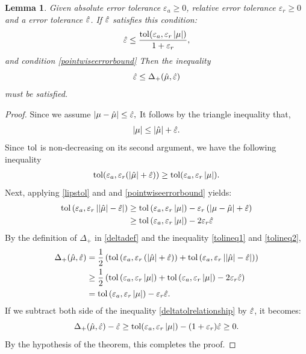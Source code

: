 \documentclass{iitthesis}
\newtheorem{lemma}[theorem]{Lemma}
\theoremstyle{definition}
\begin{document}
\begin{lemma}\label{cost2}
Given absolute error tolerance $\varepsilon_a \geq 0$, relative error tolerance $\varepsilon_r \geq 0$ and a error tolerance $\hat{\varepsilon}$. If $\hat{\varepsilon}$ satisfies this condition: $$ \hat{\varepsilon} \leq \frac{\operatorname{tol}(\varepsilon_a, \varepsilon_r\left \lvert \mu \right \rvert)}{1+\varepsilon_r}, $$ and condition \eqref{pointwiseerrorbound}
Then the inequality $$\hat{\varepsilon} \leq \Delta_{+}(\hat{\mu},\hat{\varepsilon})$$ must be satisfied.
\end{lemma}
\begin{proof}
Since we assume $\left \lvert \mu -\hat{\mu} \right \rvert\leq \hat{\varepsilon},$ It follows by the triangle inequality that,
 $$\left \lvert \mu \right \rvert \leq\left \lvert \hat{\mu} \right \rvert+\hat{\varepsilon}.$$
Since $\operatorname{tol}$ is non-decreasing on its second argument, we have the following inequality
\begin{align}\label{tolineq1}
\operatorname{tol}(\varepsilon_a, \varepsilon_r (\left \lvert \hat{\mu} \right \rvert+\hat{\varepsilon}))  \geq \operatorname{tol}(\varepsilon_a, \varepsilon_r \left \lvert \mu \right \rvert).
\end{align}
Next, applying \eqref{lipstol} and and \eqref{pointwiseerrorbound} yields:
\begin{align}
\operatorname{tol}\left(\varepsilon_a, \varepsilon_r \left \lvert \left \lvert \hat{\mu} \right \rvert-\hat{\varepsilon} \right \rvert\right)  
 &\geq \operatorname{tol}\left(\varepsilon_a, \varepsilon_r \left \lvert \mu \right \rvert\right) - \varepsilon_r\left(\left \lvert \mu-\hat{\mu} \right \rvert+\hat{\varepsilon}\right) \nonumber\\&
 \geq  \operatorname{tol}\left(\varepsilon_a, \varepsilon_r \left \lvert \mu \right \rvert\right) - 2\varepsilon_r\hat{\varepsilon} \label{tolineq2}
\end{align}
By the definition of $\Delta_{+}$ in \eqref{deltadef} and the inequality \eqref{tolineq1} and \eqref{tolineq2},
 \begin{align}
\Delta_{+}(\hat{\mu}, \hat{\varepsilon}) &= \frac{1}{2} \left ( \operatorname{tol}\left(\varepsilon_a, \varepsilon_r \left(\left \lvert \hat{\mu} \right \rvert+\hat{\varepsilon}\right)\right) +\operatorname{tol}\left(\varepsilon_a, \varepsilon_r \left \lvert \left \lvert \hat{\mu} \right \rvert-\hat{\varepsilon} \right \rvert\right) \right) \nonumber\\&
\geq \frac{1}{2} \left( \operatorname{tol}\left(\varepsilon_a,\varepsilon_r \left \lvert \mu \right \rvert\right) + \operatorname{tol}\left(\varepsilon_a, \varepsilon_r \left \lvert \mu \right \rvert\right) - 2\varepsilon_r\hat{\varepsilon} \right)\nonumber\\& =  \operatorname{tol}\left(\varepsilon_a, \varepsilon_r \left \lvert \mu \right \rvert\right) - \varepsilon_r\hat{\varepsilon}.\label{deltatolrelationship}
\end{align}
If we subtract both side of the inequality \eqref{deltatolrelationship} by $\hat{\varepsilon}$, it becomes:
$$\Delta_{+}(\hat{\mu}, \hat{\varepsilon}) -\hat{\varepsilon} \geq \operatorname{tol}(\varepsilon_a,\varepsilon_r \left \lvert \mu \right \rvert)-(1+\varepsilon_r)\hat{\varepsilon} \geq 0.$$
By the hypothesis of the theorem, this completes the proof.
\end{proof}
\end{document}
